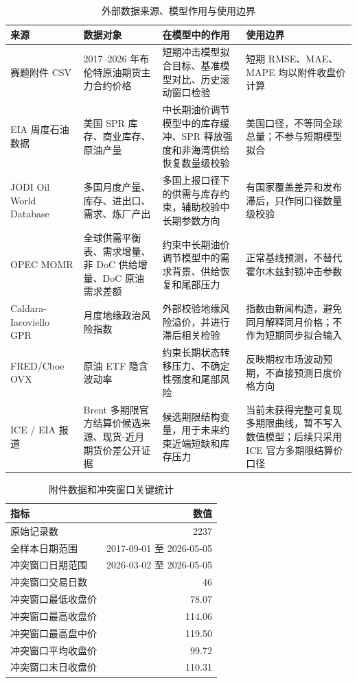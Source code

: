 \begin{table}[!htbp]
\centering
\caption{外部数据来源、模型作用与使用边界}
\label{tab:external-data-role}
\small
\begin{tabularx}{\linewidth}{L{2.8cm}L{3.0cm}L{4.0cm}Y}
\toprule
来源 & 数据对象 & 在模型中的作用 & 使用边界 \\
\midrule
赛题附件 CSV & 2017--2026 年布伦特原油期货主力合约价格 & 短期冲击模型拟合目标、基准模型对比、历史滚动窗口检验 & 短期 RMSE、MAE、MAPE 均以附件收盘价计算 \\
EIA 周度石油数据 & 美国 SPR 库存、商业库存、原油产量 & 中长期油价调节模型中的库存缓冲、SPR 释放强度和非海湾供给恢复数量级校验 & 美国口径，不等同全球总量；不参与短期模型拟合 \\
JODI Oil World Database & 多国月度产量、库存、进出口、需求、炼厂产出 & 多国上报口径下的供需与库存约束，辅助校验中长期参数方向 & 有国家覆盖差异和发布滞后，只作同口径数量级校验 \\
OPEC MOMR & 全球供需平衡表、需求增量、非 DoC 供给增量、DoC 原油需求差额 & 约束中长期油价调节模型中的需求背景、供给恢复和尾部压力 & 正常基线预测，不替代霍尔木兹封锁冲击参数 \\
Caldara-Iacoviello GPR & 月度地缘政治风险指数 & 外部校验地缘风险溢价，并进行滞后相关检验 & 指数由新闻构造，避免同月解释同月价格；不作为短期同步拟合输入 \\
FRED/Cboe OVX & 原油 ETF 隐含波动率 & 约束长期状态转移压力、不确定性强度和尾部风险 & 反映期权市场波动预期，不直接预测日度价格方向 \\
ICE / EIA 报道 & Brent 多期限官方结算价候选来源、现货-近月期货价差公开证据 & 候选期限结构变量，用于未来约束近端短缺和库存压力 & 当前未获得完整可复现多期限曲线，暂不写入数值模型；后续只采用 ICE 官方多期限结算价口径 \\
\bottomrule
\end{tabularx}
\end{table}

\begin{table}[!htbp]
\centering
\caption{附件数据和冲突窗口关键统计}
\begin{tabular}{lr}
\toprule
指标 & 数值 \\
\midrule
原始记录数 & 2237 \\
全样本日期范围 & 2017-09-01 至 2026-05-05 \\
冲突窗口日期范围 & 2026-03-02 至 2026-05-05 \\
冲突窗口交易日数 & 46 \\
冲突窗口最低收盘价 & 78.07 \\
冲突窗口最高收盘价 & 114.06 \\
冲突窗口最高盘中价 & 119.50 \\
冲突窗口平均收盘价 & 99.72 \\
冲突窗口末日收盘价 & 110.31 \\
\bottomrule
\end{tabular}
\end{table}

